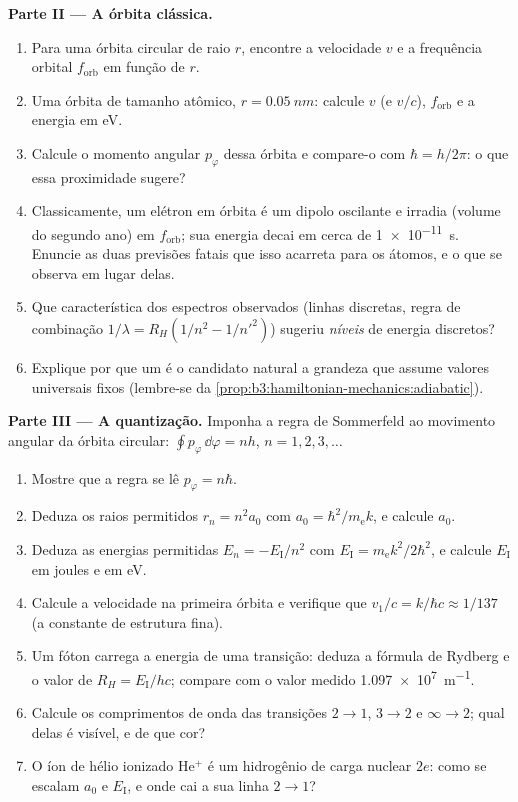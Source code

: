 \begin{problem}
\medskip\noindent\textbf{Parte II --- A órbita clássica.}
\begin{enumerate}[resume]
  \item Para uma órbita circular de raio $r$, encontre a velocidade $v$
        e a frequência orbital $f_{\text{orb}}$ em função de $r$.
  \item Uma órbita de tamanho atômico, $r = \qty{0.05}{nm}$: calcule
        $v$ (e $v/c$), $f_{\text{orb}}$ e a energia em eV.
  \item Calcule o momento angular $p_\varphi$ dessa órbita e compare-o
        com $\hbar = h/2\pi$: o que essa proximidade sugere?
  \item Classicamente, um elétron em órbita é um dipolo oscilante e
        irradia (volume do segundo ano) em $f_{\text{orb}}$; sua
        energia decai em cerca de \qty{1e-11}{s}. Enuncie as duas
        previsões fatais que isso acarreta para os átomos, e o que se
        observa em lugar delas.
  \item Que característica dos espectros observados (linhas discretas,
        regra de combinação $1/\lambda = R_H(1/n^2 - 1/n'^2)$) sugeriu
        \emph{níveis} de energia discretos?
  \item Explique por que um \emph{} é o candidato
        natural a grandeza que assume valores universais fixos
        (lembre-se da \cref{prop:b3:hamiltonian-mechanics:adiabatic}).
\end{enumerate}

\medskip\noindent\textbf{Parte III --- A quantização.}
Imponha a regra de Sommerfeld ao movimento angular da órbita circular:
$\oint p_\varphi\,\dd\varphi = nh$, $n = 1, 2, 3, \dots$
\begin{enumerate}[resume]
  \item Mostre que a regra se lê $p_\varphi = n\hbar$.
  \item Deduza os raios permitidos $r_n = n^2a_0$ com $a_0 =
        \hbar^2/m_{\text{e}}k$, e calcule $a_0$.
  \item Deduza as energias permitidas $E_n = -E_{\text{I}}/n^2$ com
        $E_{\text{I}} = m_{\text{e}}k^2/2\hbar^2$, e calcule
        $E_{\text{I}}$ em joules e em eV.
  \item Calcule a velocidade na primeira órbita e verifique que $v_1/c =
        k/\hbar c \approx 1/137$ (a constante de estrutura fina).
  \item Um fóton carrega a energia de uma transição: deduza a fórmula
        de Rydberg e o valor de $R_H = E_{\text{I}}/hc$; compare com o
        valor medido \qty{1.097e7}{m^{-1}}.
  \item Calcule os comprimentos de onda das transições $2 \to 1$,
        $3 \to 2$ e $\infty \to 2$; qual delas é visível, e de que cor?
  \item O íon de hélio ionizado He$^+$ é um hidrogênio de carga nuclear
        $2e$: como se escalam $a_0$ e $E_{\text{I}}$, e onde cai a sua
        linha $2 \to 1$?
\end{enumerate}


\end{problem}
